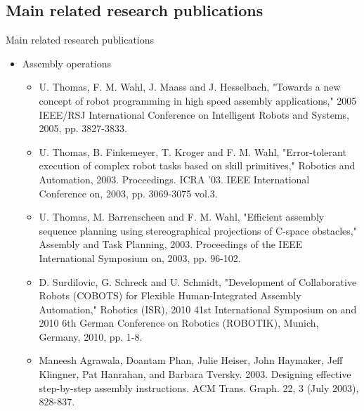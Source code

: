 \subsection{Main related research publications}
\begin{frame}{Main related research publications}
	\begin{itemize}
		\item Assembly operations
		\begin{itemize}
			\begingroup
			\scriptsize
			\item U. Thomas, F. M. Wahl, J. Maass and J. Hesselbach, "Towards a new concept of robot programming in high speed assembly applications," 2005 IEEE/RSJ International Conference on Intelligent Robots and Systems, 2005, pp. 3827-3833.
			\item U. Thomas, B. Finkemeyer, T. Kroger and F. M. Wahl, "Error-tolerant execution of complex robot tasks based on skill primitives," Robotics and Automation, 2003. Proceedings. ICRA '03. IEEE International Conference on, 2003, pp. 3069-3075 vol.3.
			\item U. Thomas, M. Barrenscheen and F. M. Wahl, "Efficient assembly sequence planning using stereographical projections of C-space obstacles," Assembly and Task Planning, 2003. Proceedings of the IEEE International Symposium on, 2003, pp. 96-102.
			\item D. Surdilovic, G. Schreck and U. Schmidt, "Development of Collaborative Robots (COBOTS) for Flexible Human-Integrated Assembly Automation," Robotics (ISR), 2010 41st International Symposium on and 2010 6th German Conference on Robotics (ROBOTIK), Munich, Germany, 2010, pp. 1-8.
			\item Maneesh Agrawala, Doantam Phan, Julie Heiser, John Haymaker, Jeff Klingner, Pat Hanrahan, and Barbara Tversky. 2003. Designing effective step-by-step assembly instructions. ACM Trans. Graph. 22, 3 (July 2003), 828-837.
			\endgroup
		\end{itemize}
	\end{itemize}
\end{frame}

